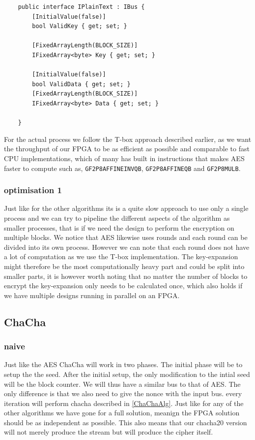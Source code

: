 \documentclass[a4paper]{article}
\begin{document}
\begin{verbatim}
    public interface IPlainText : IBus {
        [InitialValue(false)]
        bool ValidKey { get; set; }

        [FixedArrayLength(BLOCK_SIZE)]
        IFixedArray<byte> Key { get; set; }

        [InitialValue(false)]
        bool ValidData { get; set; }
        [FixedArrayLength(BLOCK_SIZE)]
        IFixedArray<byte> Data { get; set; }

    }
\end{verbatim}
For the actual process we follow the T-box approach described earlier, as we want the throughput of our FPGA to be as efficient as possible and comparable to fast CPU implementations, which of many has built in instructions that makes AES faster to compute such as, \texttt{GF2P8AFFINEINVQB}, \texttt{GF2P8AFFINEQB} and \texttt{GF2P8MULB}.
\subsubsection{optimisation 1}
\label{AESopt}
Just like for the other algorithms its is a quite slow approach to use only a single process and we can try to pipeline the different aspects of the algorithm as smaller processes, that is if we need the design to perform the encryption on multiple blocks. We notice that AES likewise uses rounds and each round can be divided into its own process. However we can note that each round does not have a lot of computation as we use the T-box implementation. The key-expansion might therefore be the most computationally heavy part and could be split into smaller parts, it is however worth noting that no matter the number of blocks to encrypt the key-expansion only needs to be calculated once, which also holds if we have multiple designs running in parallel on an FPGA.
\subsection{ChaCha}
\label{sec:org95608e5}

\subsubsection{naive}
\label{ChaChaNaive}
Just like the AES ChaCha will work in two phases. The initial phase will be to setup the the seed. After the initial setup, the only modification to the intial seed will be the block counter. We will thus have a similar bus to that of AES. The only difference is that we also need to give the nonce with the input bus. every iteration will perform chacha described in \ref{ChaChaAlg}. Just like for any of the other algorithms we have gone for a full solution, meanign the FPGA solution should be as independent as possible. This also means that our chacha20 version will not merely produce the stream but will produce the cipher itself.
\end{document}
